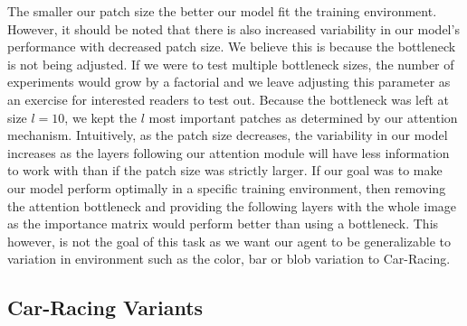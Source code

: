 \documentclass[10pt,twocolumn,letterpaper]{article}
\begin{document}
The smaller our patch size the better our model fit the training environment. However, it 
should be noted that there is also increased variability in our model's performance with
decreased patch size. We believe this is because the bottleneck is not being adjusted. 
If we were to test multiple bottleneck sizes, the number of experiments would grow by a 
factorial and we leave adjusting this parameter as an exercise for interested readers to test out.
Because the bottleneck was left at size $l = 10$, we kept the $l$ most important patches 
as determined by our attention mechanism. Intuitively, as the patch size decreases, the 
variability in our model increases as the layers following our attention module will have
less information to work with than if the patch size was strictly larger. If our goal was
to make our model perform optimally in a specific training environment, then removing the attention
bottleneck and providing the following layers with the whole image as the importance
matrix would perform better than using a bottleneck. This however, is not the goal of this task as
we want our agent to be generalizable to variation in environment such as the color, bar or 
blob variation to Car-Racing.

\subsection{Car-Racing Variants}
\end{document}
